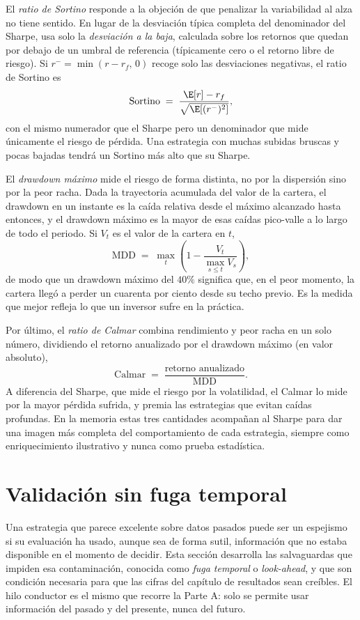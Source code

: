 El \emph{ratio de Sortino} responde a la objeción de que penalizar la variabilidad al alza no tiene sentido. En lugar de la desviación típica completa del denominador del Sharpe, usa solo la \emph{desviación a la baja}, calculada sobre los retornos que quedan por debajo de un umbral de referencia (típicamente cero o el retorno libre de riesgo). Si $r^- = \min(r - r_f,\, 0)$ recoge solo las desviaciones negativas, el ratio de Sortino es
\[
\mathrm{Sortino} \;=\; \frac{\E[r] - r_f}{\sqrt{\E[(r^-)^2]}},
\]
con el mismo numerador que el Sharpe pero un denominador que mide únicamente el riesgo de pérdida. Una estrategia con muchas subidas bruscas y pocas bajadas tendrá un Sortino más alto que su Sharpe.

El \emph{drawdown máximo} mide el riesgo de forma distinta, no por la dispersión sino por la peor racha. Dada la trayectoria acumulada del valor de la cartera, el drawdown en un instante es la caída relativa desde el máximo alcanzado hasta entonces, y el drawdown máximo es la mayor de esas caídas pico-valle a lo largo de todo el periodo. Si $V_t$ es el valor de la cartera en $t$,
\[
\mathrm{MDD} \;=\; \max_{t}\left(1 - \frac{V_t}{\max_{s \le t} V_s}\right),
\]
de modo que un drawdown máximo del $40\%$ significa que, en el peor momento, la cartera llegó a perder un cuarenta por ciento desde su techo previo. Es la medida que mejor refleja lo que un inversor sufre en la práctica.

Por último, el \emph{ratio de Calmar} combina rendimiento y peor racha en un solo número, dividiendo el retorno anualizado por el drawdown máximo (en valor absoluto),
\[
\mathrm{Calmar} \;=\; \frac{\text{retorno anualizado}}{\mathrm{MDD}}.
\]
A diferencia del Sharpe, que mide el riesgo por la volatilidad, el Calmar lo mide por la mayor pérdida sufrida, y premia las estrategias que evitan caídas profundas. En la memoria estas tres cantidades acompañan al Sharpe para dar una imagen más completa del comportamiento de cada estrategia, siempre como enriquecimiento ilustrativo y nunca como prueba estadística.

\section{Validación sin fuga temporal}
\label{sec:cpcv}

Una estrategia que parece excelente sobre datos pasados puede ser un espejismo si su evaluación ha usado, aunque sea de forma sutil, información que no estaba disponible en el momento de decidir. Esta sección desarrolla las salvaguardas que impiden esa contaminación, conocida como \emph{fuga temporal} o \emph{look-ahead}, y que son condición necesaria para que las cifras del capítulo de resultados sean creíbles. El hilo conductor es el mismo que recorre la Parte A: solo se permite usar información del pasado y del presente, nunca del futuro.

